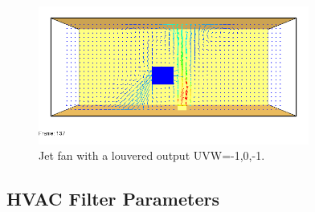 \documentclass[11pt]{book}
\begin{document}
\begin{figure}[ht!]
\begin{center}
\includegraphics[width=3.5in]{SCRIPT_FIGURES/jet_fan}
\caption[Example of a jet fan]{Jet fan with a louvered output {\ct UVW=-1,0,-1}.}
\label{fig:Jet_Fan}
\end{center}
\end{figure}


\subsection{HVAC Filter Parameters}
\label{info:HVACfilter}
\end{document}
